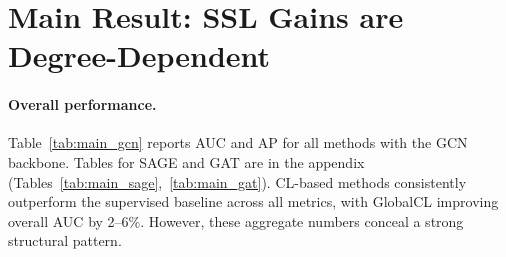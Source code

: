 \section{Main Result: SSL Gains are Degree-Dependent}
\label{sec:results}

\paragraph{Overall performance.}
Table~\ref{tab:main_gcn} reports AUC and AP for all methods with the GCN backbone. Tables for SAGE and GAT are in the appendix (Tables~\ref{tab:main_sage},~\ref{tab:main_gat}). CL-based methods consistently outperform the supervised baseline across all metrics, with GlobalCL improving overall AUC by 2--6\%. However, these aggregate numbers conceal a strong structural pattern.

